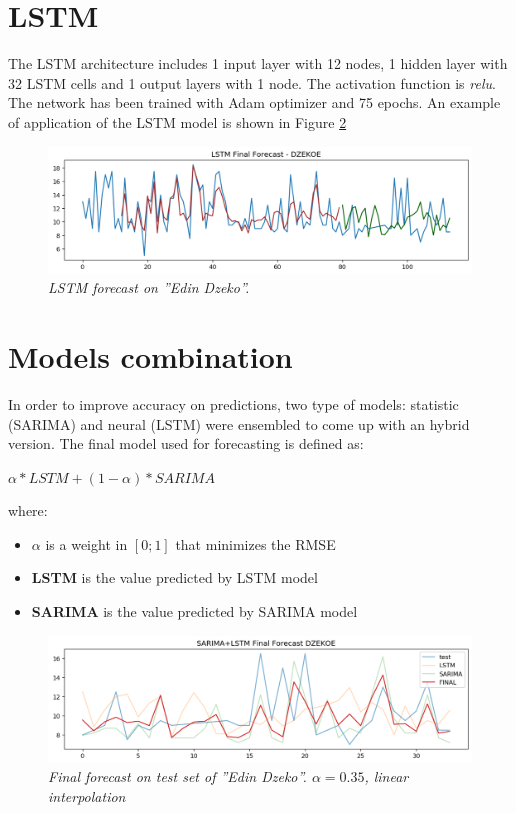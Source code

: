 \section{LSTM}
The LSTM architecture includes 1 input layer with 12 nodes, 1 hidden layer with 32 LSTM cells and 1 output layers with 1 node. The activation function is \textit{relu}.
The network has been trained with Adam optimizer and 75 epochs.
An example of application of the LSTM model is shown in Figure \ref{fig:mlp}
\begin{figure}[H]
  \includegraphics[scale=0.5]{images/dzeko_lstm_forecast.png}
   \centering  
   \caption{\textit{LSTM forecast on ''Edin Dzeko''.}}
  \label{fig:mlp}
\end{figure}


\section{Models combination}

In order to improve accuracy  on predictions, two type of models: statistic (SARIMA) and neural (LSTM)  were ensembled to come up with an hybrid version.
The final model used for forecasting is defined as:
\\
\begin{center}
  $\alpha * LSTM + (1 - \alpha) * SARIMA$
\end{center}
where:
\begin{itemize}
    \item \textbf{$\alpha$} is a weight in $[0; 1]$ that minimizes the RMSE 
    \item \textbf{LSTM} is the value predicted by LSTM model
    \item \textbf{SARIMA}  is the value predicted by SARIMA model 
\end{itemize}


\begin{figure}[H]
  \includegraphics[scale=0.5]{images/dzeko_sarima_lstm_forecast.png}
   \centering  
   \caption{\textit{Final forecast on test set of ''Edin Dzeko''. $\alpha  = 0.35$, \textit{linear interpolation}}}
  \label{fig:mlp}
\end{figure}




